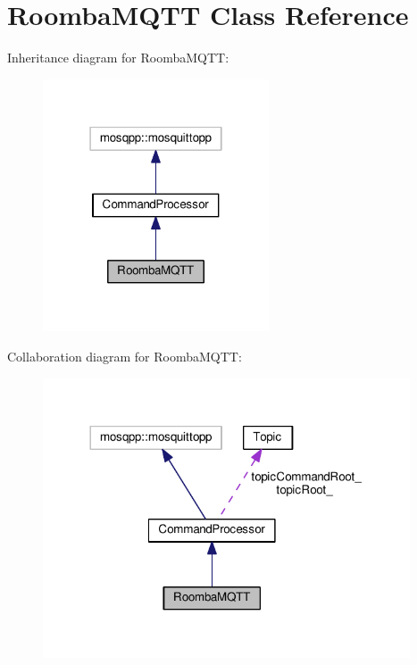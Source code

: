 \hypertarget{class_roomba_m_q_t_t}{}\section{Roomba\+M\+Q\+TT Class Reference}
\label{class_roomba_m_q_t_t}


Inheritance diagram for Roomba\+M\+Q\+TT\+:
\nopagebreak
\begin{figure}[H]
\begin{center}
\leavevmode
\includegraphics[width=190pt]{class_roomba_m_q_t_t__inherit__graph}
\end{center}
\end{figure}


Collaboration diagram for Roomba\+M\+Q\+TT\+:
\nopagebreak
\begin{figure}[H]
\begin{center}
\leavevmode
\includegraphics[width=308pt]{class_roomba_m_q_t_t__coll__graph}
\end{center}
\end{figure}
